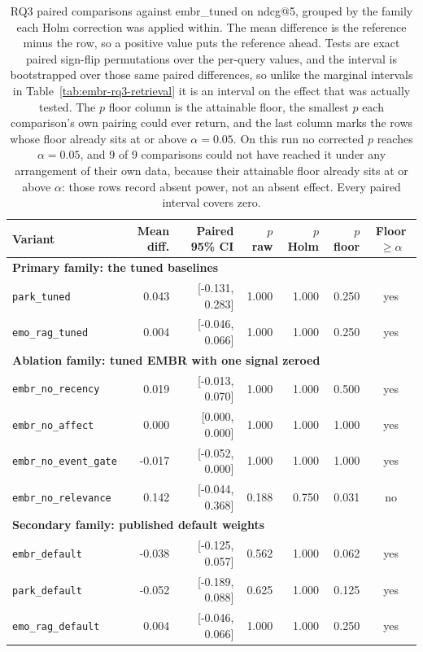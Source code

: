 \begin{table}[tb]
  \centering
  \caption{%
    RQ3 paired comparisons against embr\_tuned on ndcg@5, grouped by the family each Holm correction
    was applied within. The mean difference is the reference minus the row, so a positive value puts
    the reference ahead. Tests are exact paired sign-flip permutations over the per-query values,
    and the interval is bootstrapped over those same paired differences, so unlike the marginal
    intervals in Table~\ref{tab:embr-rq3-retrieval} it is an interval on the effect that was
    actually tested. The $p$ floor column is the attainable floor, the smallest $p$ each
    comparison's own pairing could ever return, and the last column marks the rows whose floor
    already sits at or above $\alpha = 0.05$. On this run no corrected $p$ reaches $\alpha = 0.05$,
    and 9 of 9 comparisons could not have reached it under any arrangement of their own data,
    because their attainable floor already sits at or above $\alpha$: those rows record absent
    power, not an absent effect. Every paired interval covers zero.
  }
  \label{tab:embr-rq3-comparisons}
  \footnotesize
  \setlength{\tabcolsep}{4pt}
  \begin{tabular}{lrrrrrc}
    \toprule
    Variant & Mean diff. & Paired 95\% CI & $p$ raw & $p$ Holm & $p$ floor & Floor $\geq \alpha$ \\
    \midrule
    \multicolumn{7}{l}{\textbf{Primary family: the tuned baselines}} \\
    \texttt{park\_tuned} & 0.043 & [-0.131, 0.283] & 1.000 & 1.000 & 0.250 & yes \\
    \texttt{emo\_rag\_tuned} & 0.004 & [-0.046, 0.066] & 1.000 & 1.000 & 0.250 & yes \\
    \midrule
    \multicolumn{7}{l}{\textbf{Ablation family: tuned EMBR with one signal zeroed}} \\
    \texttt{embr\_no\_recency} & 0.019 & [-0.013, 0.070] & 1.000 & 1.000 & 0.500 & yes \\
    \texttt{embr\_no\_affect} & 0.000 & [0.000, 0.000] & 1.000 & 1.000 & 1.000 & yes \\
    \texttt{embr\_no\_event\_gate} & -0.017 & [-0.052, 0.000] & 1.000 & 1.000 & 1.000 & yes \\
    \texttt{embr\_no\_relevance} & 0.142 & [-0.044, 0.368] & 0.188 & 0.750 & 0.031 & no \\
    \midrule
    \multicolumn{7}{l}{\textbf{Secondary family: published default weights}} \\
    \texttt{embr\_default} & -0.038 & [-0.125, 0.057] & 0.562 & 1.000 & 0.062 & yes \\
    \texttt{park\_default} & -0.052 & [-0.189, 0.088] & 0.625 & 1.000 & 0.125 & yes \\
    \texttt{emo\_rag\_default} & 0.004 & [-0.046, 0.066] & 1.000 & 1.000 & 0.250 & yes \\
    \bottomrule
  \end{tabular}
\end{table}
